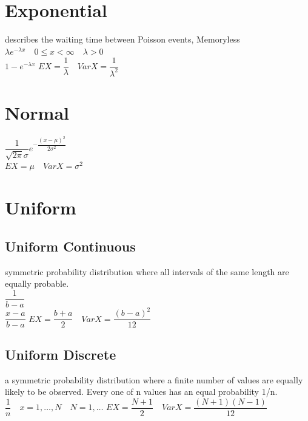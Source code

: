 \documentclass[openany]{book}
\begin{document}
\section{Exponential}
describes the waiting time between Poisson events, Memoryless\\
$\lambda e^{-\lambda x} \quad 0\leq x<\infty \quad \lambda>0$\\
$1-e^{-\lambda x}$\medbreak
$EX=\dfrac{1}{\lambda} \quad VarX=\dfrac{1}{\lambda^2}$
\section{Normal}
$\dfrac{1}{\sqrt{2\pi}\sigma}e^{-\dfrac{(x-\mu)^2}{2\sigma^2}}$\\
$EX=\mu \quad VarX=\sigma^2$
\section{Uniform}
\subsection{Uniform Continuous}
symmetric probability distribution where all intervals of the same length are equally probable.\\
$\dfrac{1}{b-a}$\\
$\dfrac{x-a}{b-a}$\medbreak
$EX=\dfrac{b+a}{2} \quad VarX=\dfrac{(b-a)^2}{12}$
\subsection{Uniform Discrete}
a symmetric probability distribution where a finite number of values are equally likely to be observed. Every one of n values has an equal probability 1/n.\\
$\dfrac{1}{n} \quad x=1,\dots,N \quad N=1,\dots$\medbreak
$EX=\dfrac{N+1}{2} \quad VarX=\dfrac{(N+1)(N-1)}{12}$
\end{document}
